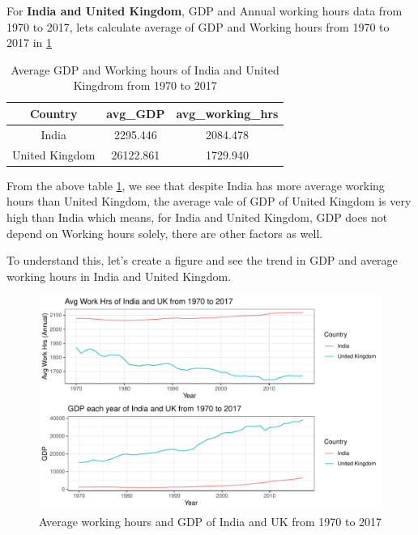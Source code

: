 \documentclass[11pt,a4paper,]{article}
\begin{document}
For \textbf{India and United Kingdom}, GDP and Annual working hours data from 1970 to 2017, lets calculate average of GDP and Working hours from 1970 to 2017 in \ref{tab:TableAvg}

\begin{table}[!h]

\caption{\label{tab:TableAvg}Average GDP and Working hours of India and United Kingdrom from 1970 to 2017}
\centering
\begin{tabular}[t]{c|c|c}
\hline
Country & avg\_GDP & avg\_working\_hrs\\
\hline
India & 2295.446 & 2084.478\\
\hline
United Kingdom & 26122.861 & 1729.940\\
\hline
\end{tabular}
\end{table}

From the above table \ref{tab:TableAvg}, we see that despite India has more average working hours than United Kingdom, the average vale of GDP of United Kingdom is very high than India which means, for India and United Kingdom, GDP does not depend on Working hours solely, there are other factors as well.

To understand this, let's create a figure and see the trend in GDP and average working hours in India and United Kingdom.

\begin{figure}

{\centering \includegraphics{report_files/figure-latex/FigTrend-1} 

}

\caption{Average working hours and GDP of India and UK from 1970 to 2017}\label{fig:FigTrend}
\end{figure}
\end{document}
